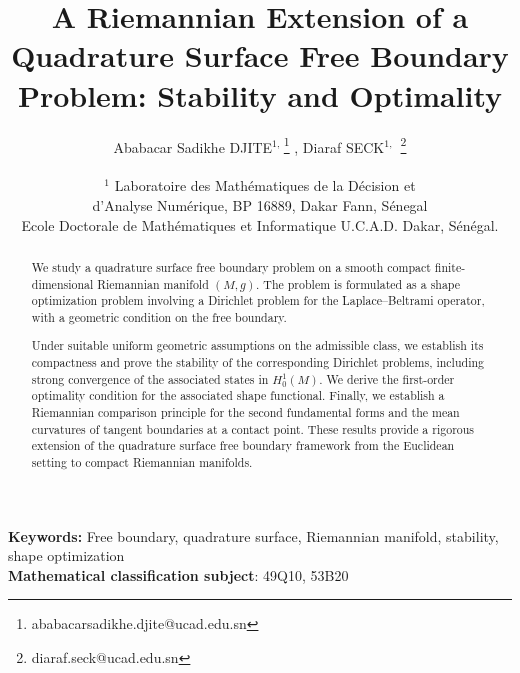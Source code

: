 \documentclass{article}
\title{A Riemannian Extension of a Quadrature Surface Free Boundary Problem: Stability and Optimality}
\author{Ababacar Sadikhe DJITE$^{1,\,}$\footnote{ababacarsadikhe.djite@ucad.edu.sn} ,  Diaraf SECK$^{1,\,}$ \footnote{diaraf.seck@ucad.edu.sn}\\\\
$^{1}$ Laboratoire des Math\'ematiques de la D\'ecision et \\
d'Analyse Num\'erique, BP 16889, Dakar Fann, S\'enegal\\
Ecole Doctorale de Math\'ematiques et Informatique U.C.A.D. Dakar,  S\'en\'egal.}
\begin{document}
\maketitle
\begin{abstract}
We study a quadrature surface free boundary problem on a smooth
compact finite-dimensional Riemannian manifold $(M,g)$. The problem is
formulated as a shape optimization problem involving a Dirichlet
problem for the Laplace--Beltrami operator, with a geometric condition
on the free boundary.

Under suitable uniform geometric assumptions on the admissible class,
we establish its compactness and prove the stability of the
corresponding Dirichlet problems, including strong convergence of the
associated states in $H_0^1(M)$. We derive the first-order optimality
condition for the associated shape functional. Finally, we establish a
Riemannian comparison principle for the second fundamental forms and
the mean curvatures of tangent boundaries at a contact point. These
results provide a rigorous extension of the quadrature surface free
boundary framework from the Euclidean setting to compact Riemannian
manifolds.
\end{abstract}
{\bf Keywords:} Free boundary, quadrature surface, Riemannian manifold, stability, shape optimization \\
{\bf Mathematical classification subject}: 49Q10, 53B20
\end{document}
